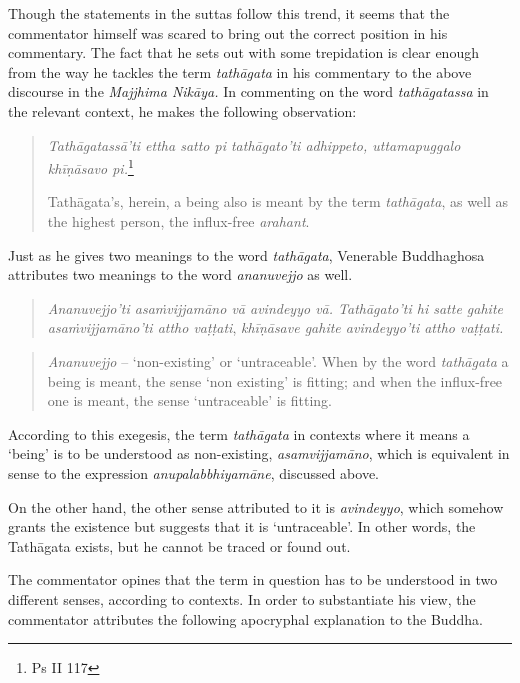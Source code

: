Though the statements in the suttas follow this trend, it seems that the commentator himself was scared to bring out the correct position in his commentary. The fact that he sets out with some trepidation is clear enough from the way he tackles the term \emph{tathāgata} in his commentary to the above discourse in the \emph{Majjhima Nikāya.} In commenting on the word \emph{tathāgatassa} in the relevant context, he makes the following observation:

\begin{quote}
\emph{Tathāgatassā'ti ettha satto pi tathāgato'ti adhippeto, uttamapuggalo khīṇāsavo pi.}\footnote{Ps II 117}

Tathāgata's, herein, a being also is meant by the term \emph{tathāgata}, as well as the highest person, the influx-free \emph{arahant}.
\end{quote}

Just as he gives two meanings to the word \emph{tathāgata}, Venerable Buddhaghosa attributes two meanings to the word \emph{ananuvejjo} as well.

\begin{quote}
\emph{Ananuvejjo'ti asaṁvijjamāno vā avindeyyo vā. Tathāgato'ti hi satte gahite asaṁvijjamāno'ti attho vaṭṭati}, \emph{khīṇāsave gahite avindeyyo'ti attho vaṭṭati.}
\end{quote}

\begin{quote}
\emph{Ananuvejjo} -- `non-existing' or `untraceable'. When by the word \emph{tathāgata} a being is meant, the sense `non existing' is fitting; and when the influx-free one is meant, the sense `untraceable' is fitting.
\end{quote}

According to this exegesis, the term \emph{tathāgata} in contexts where it means a `being' is to be understood as non-existing, \emph{asamvijjamāno}, which is equivalent in sense to the expression \emph{anupalabbhiyamāne}, discussed above.

On the other hand, the other sense attributed to it is \emph{avindeyyo}, which somehow grants the existence but suggests that it is `untraceable'. In other words, the Tathāgata exists, but he cannot be traced or found out.

The commentator opines that the term in question has to be understood in two different senses, according to contexts. In order to substantiate his view, the commentator attributes the following apocryphal explanation to the Buddha.

